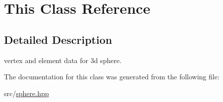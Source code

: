 \hypertarget{classThis}{}\section{This Class Reference}
\label{classThis}


\subsection{Detailed Description}
vertex and element data for 3d sphere. 

The documentation for this class was generated from the following file\+:\begin{DoxyCompactItemize}
\item 
src/\mbox{\hyperlink{sphere_8hpp}{sphere.\+hpp}}\end{DoxyCompactItemize}
